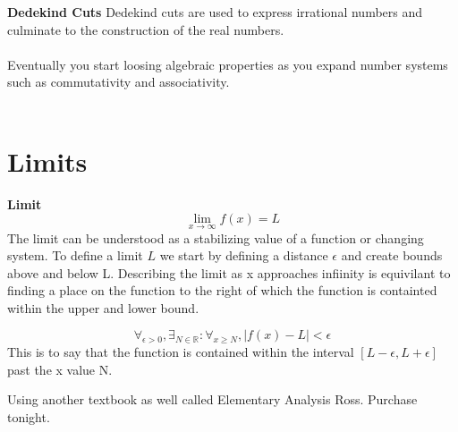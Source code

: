 \documentclass[12pt]{article}
\newcommand{\sect}[1]{\section*{#1}}
\newcommand{\R}{\mathbb{R}}
\newcommand{\xlim}{\lim_{x\rightarrow \infty}}
\newcommand{\ep}{\epsilon}
\begin{document}
\textbf{Dedekind Cuts} Dedekind cuts are used to express irrational numbers and culminate to the construction of the real numbers.\\\\
Eventually you start loosing algebraic properties as you expand number systems such as commutativity and associativity. \\\\
\sect{Limits}
\textbf{Limit}
\[
  \xlim f(x)=L
\]
The limit can be understood as a stabilizing value of a function or changing system. To define a limit $L$ we start by defining a distance $\ep$ and create bounds above and below L. Describing the limit as x approaches infiinity is equivilant to finding a place on the function to the right of which the function is containted within the upper and lower bound.

\[
  \forall_{\ep > 0}, \exists_{N\in \R} : \forall_{x \geq N} , |f(x)-L|<\ep
\]
This is to say that the function is contained within the interval $ [L-\ep, L+\ep]$ past the x value N.

Using another textbook as well called Elementary Analysis Ross. Purchase tonight. 
\end{document}
